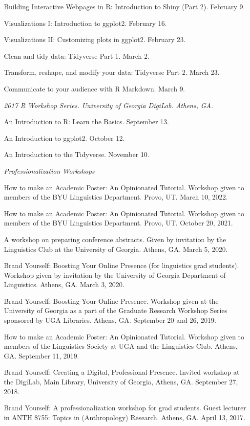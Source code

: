 \documentclass[
]{article}
\begin{document}
Building Interactive Webpages in R: Introduction to Shiny (Part 2).
February 9.

Visualizations I: Introduction to ggplot2. February 16.

Visualizations II: Customizing plots in ggplot2. February 23.

Clean and tidy data: Tidyverse Part 1. March 2.

Transform, reshape, and modify your data: Tidyverse Part 2. March 23.

Communicate to your audience with R Markdown. March 9.

\emph{2017 R Workshop Series. University of Georgia DigiLab. Athens,
GA.}

An Introduction to R: Learn the Basics. September 13.

An Introduction to ggplot2. October 12.

An Introduction to the Tidyverse. November 10.

\emph{Professionalization Workshops}

How to make an Academic Poster: An Opinionated Tutorial. Workshop given
to members of the BYU Linguistics Department. Provo, UT. March 10, 2022.

How to make an Academic Poster: An Opinionated Tutorial. Workshop given
to members of the BYU Linguistics Department. Provo, UT. October 20,
2021.

A workshop on preparing conference abstracts. Given by invitation by the
Linguistics Club at the University of Georgia. Athens, GA. March 5,
2020.

Brand Yourself: Boosting Your Online Presence (for linguistics grad
students). Workshop given by invitation by the University of Georgia
Department of Linguistics. Athens, GA. March 3, 2020.

Brand Yourself: Boosting Your Online Presence. Workshop given at the
University of Georgia as a part of the Graduate Research Workshop Series
sponsored by UGA Libraries. Athens, GA. September 20 and 26, 2019.

How to make an Academic Poster: An Opinionated Tutorial. Workshop given
to members of the Linguistics Society at UGA and the Linguistics Club.
Athens, GA. September 11, 2019.

Brand Yourself: Creating a Digital, Professional Presence. Invited
workshop at the DigiLab, Main Library, University of Georgia, Athens,
GA. September 27, 2018.

Brand Yourself: A professionalization workshop for grad students. Guest
lecturer in ANTH 8755: Topics in (Anthropology) Research. Athens, GA.
April 13, 2017.
\end{document}
